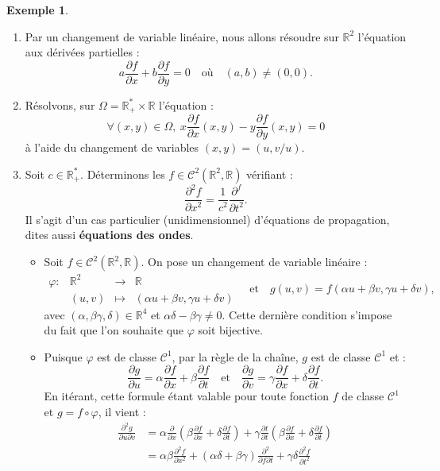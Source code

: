 \documentclass[french]{article}
\newcommand{\R}{\mathbb{R}}
\newcommand{\st}{^*}
\theoremstyle{plain}
\theoremstyle{definition}
\newtheorem*{ex}{Exemple}
\theoremstyle{remark}
\begin{document}
\begin{ex}
	\begin{enumerate}
		\item Par un changement de variable linéaire, nous allons résoudre sur $\R^2$ l'équation aux dérivées partielles :
		$$a\frac{\partial f}{\partial x}+b\frac{\partial f}{\partial y}=0\quad\text{où}\quad(a,b)\ne(0,0).$$
		\item Résolvons, sur $\Omega=\R_+\st\times\R$ l'équation :
		$$\forall (x,y)\in\Omega,\ x\frac{\partial f}{\partial x}(x,y)-y\frac{\partial f}{\partial y}(x,y)=0$$ à l'aide du changement de variables $(x,y)=(u,v/u)$.
		\item Soit $c\in\R_+\st$. Déterminons les $f\in\mathcal{C}^2(\R^2,\R)$ vérifiant :
		$$\frac{\partial^2f}{\partial x^2}=\frac{1}{c^2}\frac{\partial^f}{\partial t^2}.$$ Il s'agit d'un cas particulier (unidimensionnel) d'équations de propagation, dites aussi \textbf{équations des ondes}.
		\begin{itemize}
			\item Soit $f\in\mathcal{C}^2(\R^2,\R)$. On pose un changement de variable linéaire :
			$$\begin{array}{lrcl}
				\varphi:&\R^2&\longrightarrow&\R\\
				&(u,v)&\longmapsto&(\alpha u+\beta v,\gamma u+\delta v)
			\end{array}\quad\text{et}\quad g(u,v)=f(\alpha u+\beta v,\gamma u+\delta v),$$ avec $(\alpha,\beta\gamma,\delta)\in\R^4$ et $\alpha\delta-\beta\gamma\ne0$. Cette dernière condition s'impose du fait que l'on souhaite que $\varphi$ soit bijective.
			\item Puisque $\varphi$ est de classe $\mathcal{C}^1$, par la règle de la chaîne, $g$ est de classe $\mathcal{C}^1$ et :
			$$\frac{\partial g}{\partial u}=\alpha\frac{\partial f}{\partial x}+\beta\frac{\partial f}{\partial t}\quad\text{et}\quad\frac{\partial g}{\partial v}=\gamma\frac{\partial f}{\partial x}+\delta\frac{\partial f}{\partial t}.$$
			En itérant, cette formule étant valable pour toute fonction $f$ de classe $\mathcal{C}^1$ et $g=f\circ\varphi$, il vient :
			\begin{align*}
				\frac{\partial^2g}{\partial u\partial v}&=\alpha\frac{\partial}{\partial x}\left(\beta\frac{\partial f}{\partial x}+\delta\frac{\partial f}{\partial t}\right)+\gamma\frac{\partial t}{\partial t}\left(\beta\frac{\partial f}{\partial x}+\delta\frac{\partial f}{\partial t}\right)\\[2mm]
				&=\alpha\beta\frac{\partial^2f}{\partial x^2}+(\alpha\delta+\beta\gamma)\frac{\partial ^2}{\partial f\partial t}+\gamma\delta\frac{\partial^2f}{\partial t^2}

\end{align*}
\end{itemize}
\end{enumerate}
\end{ex}
\end{document}
